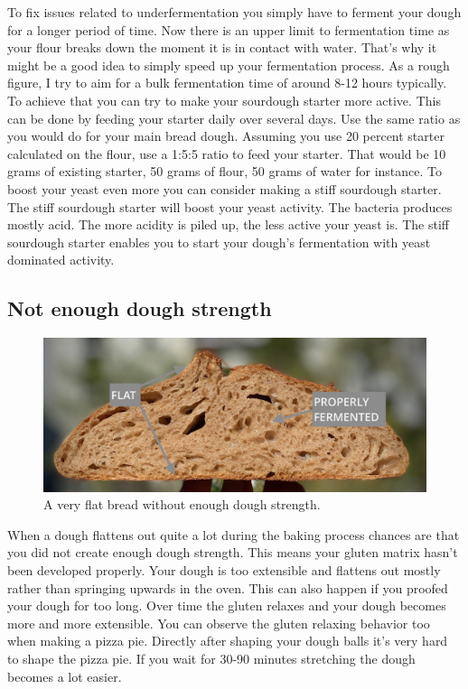 To fix issues related to underfermentation you simply have to ferment your dough
for a longer period of time. Now there is an upper limit to fermentation time
as your flour breaks down the moment it is in contact with water. That's why it
might be a good idea to simply speed up your fermentation process. As a rough
figure, I try to aim for a bulk fermentation time of around 8-12 hours typically.
To achieve that you can try to make your sourdough starter more active.  This can be done
by feeding your starter daily over several days. Use the same ratio as you would
do for your main bread dough. Assuming you use 20 percent starter calculated on the flour,
use a 1:5:5 ratio to feed your starter. That would be 10 grams of existing starter,
50 grams of flour, 50 grams of water for instance. To boost your yeast even more you can
consider making a stiff sourdough starter. The stiff sourdough starter will
boost your yeast activity. The bacteria produces mostly acid. The more acidity
is piled up, the less active your yeast is. The stiff sourdough starter
enables you to start your dough's fermentation with yeast dominated activity.


\subsection{Not enough dough strength}

\begin{figure}
  \includegraphics[width=\textwidth]{flat-bread}
  \caption{A very flat bread without enough dough strength.}
  \label{flat-bread}
\end{figure}

When a dough flattens out quite a lot during the baking process chances are
that you did not create enough dough strength. This means your gluten matrix
hasn't been developed properly. Your dough is too extensible and flattens out
mostly rather than springing upwards in the oven. This can also happen if you
proofed your dough for too long. Over time the gluten relaxes and your dough
becomes more and more extensible. You can observe the gluten relaxing behavior
too when making a pizza pie. Directly after shaping your dough balls it's very hard to shape
the pizza pie. If you wait for 30-90 minutes stretching the dough becomes a lot easier.

